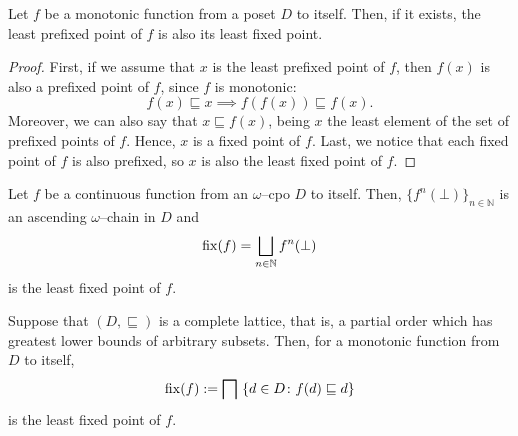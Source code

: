 \begin{lem}\label{lem:cpo-prefixed}
  Let \(f\) be a monotonic function from a poset \(D\) to itself.
  Then, if it exists, the least prefixed point of \(f\) is also its least fixed point.
\end{lem}
\begin{proof}
  First, if we assume that \(x\) is the least prefixed point of \(f\), then \(f(x)\) is also a prefixed point of \(f\), since \(f\) is monotonic:
  \begin{equation*}
    f(x) \sqsubseteq x \implies f(f(x)) \sqsubseteq f(x).
  \end{equation*}
  Moreover, we can also say that \(x \sqsubseteq f(x)\), being \(x\) the least element of the set of prefixed points of \(f\).
  Hence, \(x\) is a fixed point of \(f\).
  Last, we notice that each fixed point of \(f\) is also prefixed, so \(x\) is also the least fixed point of \(f\).\qedhere
\end{proof}

\begin{thm}\label{thm:cpo-fixed}
  Let \(f\) be a continuous function from an \(\omega\)--cpo \(D\) to itself.
  Then, \(\lbrace f^n(\bot) \rbrace_{n \in \mathbb{N}}\) is an ascending \(\omega\)--chain in \(D\) and
  \begin{equation}
    \operatorname{fix}(f) = \bigsqcup_{n \in \mathbb{N}} f^n(\bot)
  \end{equation}
  is the least fixed point of \(f\).  
\end{thm}

\begin{thm}\label{thm:knaster-tarski}
  Suppose that \((D, {}\sqsubseteq)\) is a complete lattice, that is, a partial order which has greatest lower bounds of arbitrary subsets.
  Then, for a monotonic function from \(D\) to itself,
  \begin{equation}
    \fix(f) := \bigsqcap\,\,\lbrace d \in D \colon f(d) \sqsubseteq d \rbrace
  \end{equation}
  is the least fixed point of \(f\).
\end{thm}